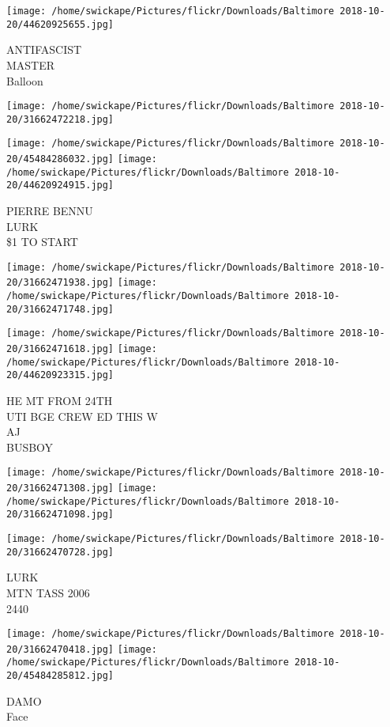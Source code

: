 \documentclass[10pt,letterpaper]{article}
\begin{document}
\vspace{0.25in}
\texttt{[image: /home/swickape/Pictures/flickr/Downloads/Baltimore 2018-10-20/44620925655.jpg]}

ANTIFASCIST\\
MASTER\\
Balloon\\
\pagebreak

\texttt{[image: /home/swickape/Pictures/flickr/Downloads/Baltimore 2018-10-20/31662472218.jpg]}

\vspace{0.25in}
\texttt{[image: /home/swickape/Pictures/flickr/Downloads/Baltimore 2018-10-20/45484286032.jpg]}
\texttt{[image: /home/swickape/Pictures/flickr/Downloads/Baltimore 2018-10-20/44620924915.jpg]}

PIERRE BENNU\\
LURK\\
\$1 TO START\\
\pagebreak

\texttt{[image: /home/swickape/Pictures/flickr/Downloads/Baltimore 2018-10-20/31662471938.jpg]}
\texttt{[image: /home/swickape/Pictures/flickr/Downloads/Baltimore 2018-10-20/31662471748.jpg]}

\texttt{[image: /home/swickape/Pictures/flickr/Downloads/Baltimore 2018-10-20/31662471618.jpg]}
\texttt{[image: /home/swickape/Pictures/flickr/Downloads/Baltimore 2018-10-20/44620923315.jpg]}

HE MT FROM 24TH\\
UTI BGE CREW ED THIS W\\
AJ\\
BUSBOY\\
\pagebreak

\texttt{[image: /home/swickape/Pictures/flickr/Downloads/Baltimore 2018-10-20/31662471308.jpg]}
\texttt{[image: /home/swickape/Pictures/flickr/Downloads/Baltimore 2018-10-20/31662471098.jpg]}

\vspace{0.25in}
\texttt{[image: /home/swickape/Pictures/flickr/Downloads/Baltimore 2018-10-20/31662470728.jpg]}

LURK\\
MTN TASS 2006\\
2440\\
\pagebreak

\texttt{[image: /home/swickape/Pictures/flickr/Downloads/Baltimore 2018-10-20/31662470418.jpg]}
\texttt{[image: /home/swickape/Pictures/flickr/Downloads/Baltimore 2018-10-20/45484285812.jpg]}

DAMO\\
Face\\
\pagebreak
\end{document}
